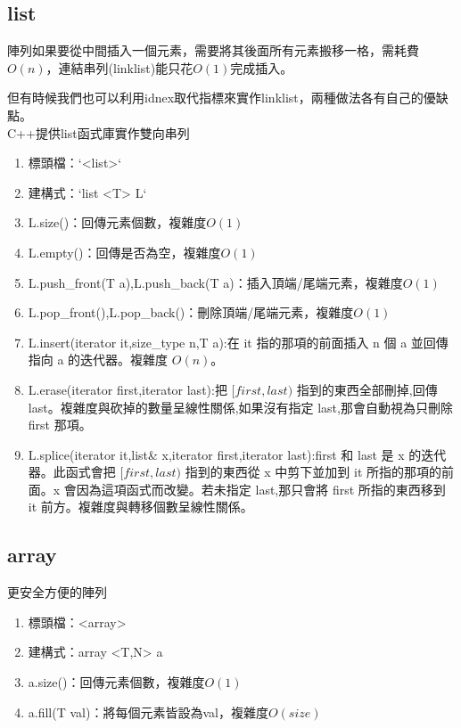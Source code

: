 \subsection{list}
陣列如果要從中間插入一個元素，需要將其後面所有元素搬移一格，需耗費$O(n)$，連結串列(linklist)能只花$O(1)$完成插入。


但有時候我們也可以利用idnex取代指標來實作linklist，兩種做法各有自己的優缺點。\\
C++提供list函式庫實作雙向串列
\begin{enumerate}
\item 標頭檔：`<list>`
\item 建構式：`list <T> L`
\item L.size()：回傳元素個數，複雜度$O(1)$
\item L.empty()：回傳是否為空，複雜度$O(1)$
\item L.push\_front(T a),L.push\_back(T a)：插入頂端/尾端元素，複雜度$O(1)$
\item L.pop\_front(),L.pop\_back()：刪除頂端/尾端元素，複雜度$O(1)$
\item L.insert(iterator it,size\_type n,T a):在 it 指的那項的前面插入 n 個 a 並回傳指向 a 的迭代器。複雜度 $O(n)$。
\item L.erase(iterator first,iterator last):把 $[first,last)$ 指到的東西全部刪掉,回傳 last。複雜度與砍掉的數量呈線性關係,如果沒有指定 last,那會自動視為只刪除 first 那項。
\item L.splice(iterator it,list\& x,iterator first,iterator last):first 和 last 是 x 的迭代器。此函式會把 $[first,last)$ 指到的東西從 x 中剪下並加到 it 所指的那項的前面。x 會因為這項函式而改變。若未指定 last,那只會將 first 所指的東西移到 it 前方。複雜度與轉移個數呈線性關係。
\end{enumerate}

\subsection{array}
更安全方便的陣列
\begin{enumerate}
\item 標頭檔：<array>
\item 建構式：array <T,N> a
\item a.size()：回傳元素個數，複雜度$O(1)$
\item a.fill(T val)：將每個元素皆設為val，複雜度$O(size)$
\end{enumerate}

